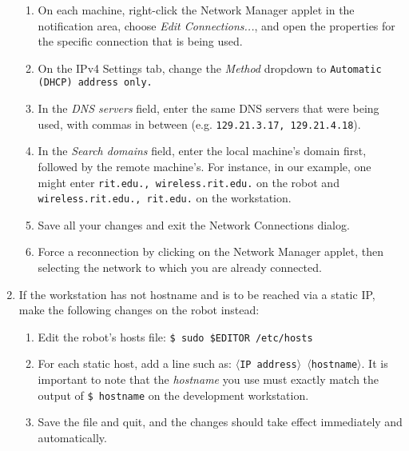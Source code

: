 \documentclass[12pt]{report}
\begin{document}
\begin{enumerate}
\begin{enumerate}
\item{On each machine, right-click the Network Manager applet in the notification area, choose \textit{Edit Connections...}, and open the properties for the specific connection that is being used.}
\item{On the IPv4 Settings tab, change the \textit{Method} dropdown to \texttt{Automatic (DHCP) address only.}}
\item{In the \textit{DNS servers} field, enter the same DNS servers that were being used, with commas in between (e.g. \texttt{129.21.3.17, 129.21.4.18}).}
\item{In the \textit{Search domains} field, enter the local machine's domain first, followed by the remote machine's.  For instance, in our example, one might enter \texttt{rit.edu., wireless.rit.edu.} on the robot and \texttt{wireless.rit.edu., rit.edu.} on the workstation.}
\item{Save all your changes and exit the Network Connections dialog.}
\item{Force a reconnection by clicking on the Network Manager applet, then selecting the network to which you are already connected.}
\end{enumerate}
\item{If the workstation has not hostname and is to be reached via a static IP, make the following changes on the robot instead:}
\begin{enumerate}
\item{Edit the robot's hosts file: \texttt{\$\ sudo \$EDITOR /etc/hosts}}
\item{For each static host, add a line such as: \texttt{$\langle$IP address$\rangle$ $\langle$hostname$\rangle$}.  It is important to note that the \textit{hostname} you use must exactly match the output of \texttt{\$\ hostname} on the development workstation.}
\item{Save the file and quit, and the changes should take effect immediately and automatically.}
\end{enumerate}
\end{enumerate}
\end{document}

